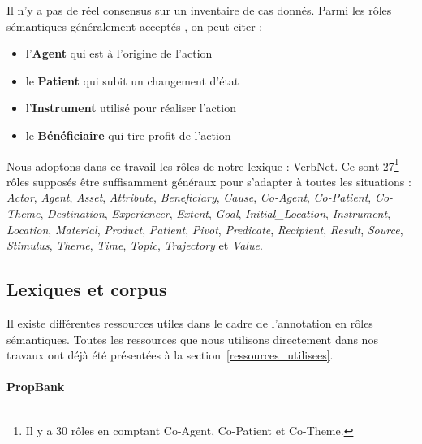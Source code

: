 Il n'y a pas de réel consensus sur un inventaire de cas donnés. Parmi les rôles
sémantiques généralement acceptés \citep[p.~4]{palmer2010semantic}, on peut
citer :

\begin{itemize}
    \item l'\textbf{Agent} qui est à l'origine de l'action
    \item le \textbf{Patient} qui subit un changement d'état
    \item l'\textbf{Instrument} utilisé pour réaliser l'action
    \item le \textbf{Bénéficiaire} qui tire profit de l'action
\end{itemize}

Nous adoptons dans ce travail les rôles de notre lexique : VerbNet. Ce sont
27\footnote{Il y a 30 rôles en comptant Co-Agent, Co-Patient et Co-Theme.}
rôles supposés être suffisamment généraux pour s'adapter à toutes les
situations : \textit{Actor}, \textit{Agent}, \textit{Asset},
\textit{Attribute}, \textit{Beneficiary}, \textit{Cause}, \textit{Co-Agent},
\textit{Co-Patient}, \textit{Co-Theme}, \textit{Destination},
\textit{Experiencer}, \textit{Extent}, \textit{Goal},
\textit{Initial\_Location}, \textit{Instrument}, \textit{Location},
\textit{Material}, \textit{Product}, \textit{Patient}, \textit{Pivot},
\textit{Predicate}, \textit{Recipient}, \textit{Result}, \textit{Source},
\textit{Stimulus}, \textit{Theme}, \textit{Time}, \textit{Topic},
\textit{Trajectory} et \textit{Value}.

\subsection{Lexiques et corpus}
\label{ressources_non_utilisees}

Il existe différentes ressources utiles dans le cadre de l'annotation en rôles
sémantiques. Toutes les ressources que nous utilisons directement dans nos
travaux ont déjà été présentées à la section~\ref{ressources_utilisees}.

\paragraph{PropBank}

